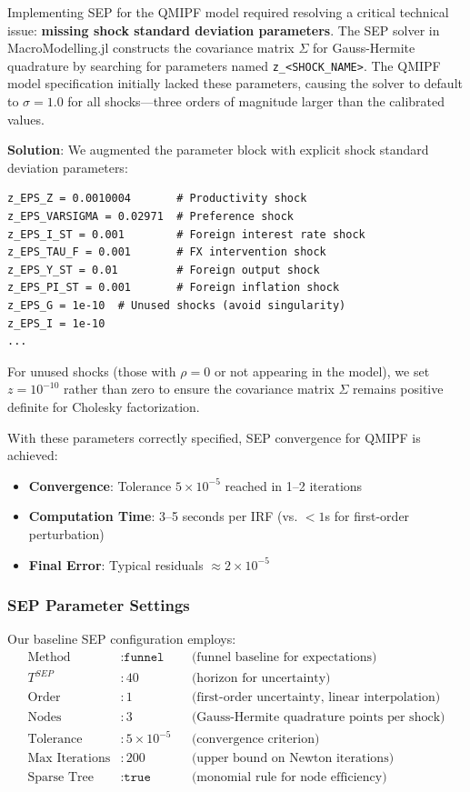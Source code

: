 \documentclass[12pt]{article}
\begin{document}
Implementing SEP for the QMIPF model required resolving a critical technical issue: \textbf{missing shock standard deviation parameters}. The SEP solver in MacroModelling.jl constructs the covariance matrix $\Sigma$ for Gauss-Hermite quadrature by searching for parameters named \texttt{z\_<SHOCK\_NAME>}. The QMIPF model specification initially lacked these parameters, causing the solver to default to $\sigma = 1.0$ for all shocks---three orders of magnitude larger than the calibrated values.

\textbf{Solution}: We augmented the parameter block with explicit shock standard deviation parameters:
\begin{verbatim}
z_EPS_Z = 0.0010004       # Productivity shock
z_EPS_VARSIGMA = 0.02971  # Preference shock
z_EPS_I_ST = 0.001        # Foreign interest rate shock
z_EPS_TAU_F = 0.001       # FX intervention shock
z_EPS_Y_ST = 0.01         # Foreign output shock
z_EPS_PI_ST = 0.001       # Foreign inflation shock
z_EPS_G = 1e-10  # Unused shocks (avoid singularity)
z_EPS_I = 1e-10
...
\end{verbatim}
For unused shocks (those with $\rho = 0$ or not appearing in the model), we set $z = 10^{-10}$ rather than zero to ensure the covariance matrix $\Sigma$ remains positive definite for Cholesky factorization.

With these parameters correctly specified, SEP convergence for QMIPF is achieved:
\begin{itemize}
\item \textbf{Convergence}: Tolerance $5 \times 10^{-5}$ reached in 1--2 iterations
\item \textbf{Computation Time}: 3--5 seconds per IRF (vs. $<1$s for first-order perturbation)
\item \textbf{Final Error}: Typical residuals $\approx 2 \times 10^{-5}$
\end{itemize}

\subsubsection{SEP Parameter Settings}

Our baseline SEP configuration employs:
\begin{align*}
\text{Method} &: \texttt{funnel} && \text{(funnel baseline for expectations)} \\
T^{SEP} &: 40 && \text{(horizon for uncertainty)} \\
\text{Order} &: 1 && \text{(first-order uncertainty, linear interpolation)} \\
\text{Nodes} &: 3 && \text{(Gauss-Hermite quadrature points per shock)} \\
\text{Tolerance} &: 5 \times 10^{-5} && \text{(convergence criterion)} \\
\text{Max Iterations} &: 200 && \text{(upper bound on Newton iterations)} \\
\text{Sparse Tree} &: \texttt{true} && \text{(monomial rule for node efficiency)}
\end{align*}
\end{document}
